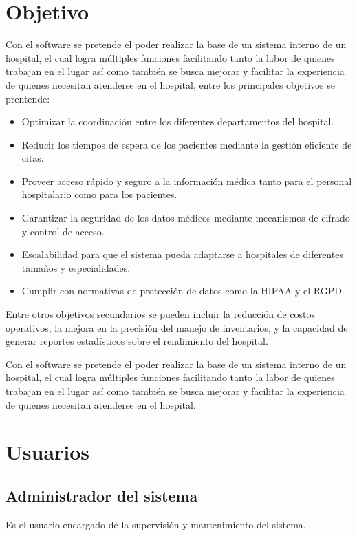 \documentclass[10pt]{article}
\newlength{\x}
\begin{document}
\section{Objetivo}
Con el software se pretende el poder realizar la base de un sistema interno de un hospital, el cual logra múltiples
funciones facilitando tanto la labor de quienes trabajan en el lugar así como también se busca mejorar y facilitar la
experiencia de quienes necesitan atenderse en el hospital, entre los principales objetivos se prentende:
\begin{itemize}
\item Optimizar la coordinación entre los diferentes departamentos del hospital.
\item Reducir los tiempos de espera de los pacientes mediante la gestión eficiente de citas.
\item Proveer acceso rápido y seguro a la información médica tanto para el personal hospitalario como para los pacientes.
\item Garantizar la seguridad de los datos médicos mediante mecanismos de cifrado y control de acceso.
\item Escalabilidad para que el sistema pueda adaptarse a hospitales de diferentes tamaños y especialidades.
\item Cumplir con normativas de protección de datos como la HIPAA y el RGPD.
\end{itemize}

Entre otros objetivos secundarios se pueden incluir la reducción de costos operativos, la mejora en la precisión del manejo de inventarios, y la capacidad de generar reportes estadísticos sobre el rendimiento del hospital.






Con el software se pretende el poder realizar la base de un sistema interno de un hospital, el cual logra múltiples funciones facilitando tanto la labor de quienes trabajan en el lugar así como también se busca mejorar y facilitar la experiencia de quienes necesitan atenderse en el hospital.


\section{Usuarios}
\subsection{Administrador del sistema}
Es el usuario encargado de la supervisión y mantenimiento del sistema.
\end{document}
